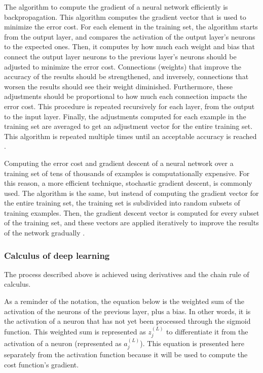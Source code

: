 ﻿\documentclass[12pt,a4paper,notitlepage]{article}
\begin{document}
The algorithm to compute the gradient of a neural network  efficiently is backpropagation. This algorithm computes the gradient vector that is used to minimize the error cost. For each element in the training set, the algorithm starts from the output layer, and compares the activation of the output layer's neurons to the expected ones. Then, it computes by how much each weight and bias that connect the output layer neurons to the previous layer's neurons should be adjusted to minimize the error cost.  Connections (weights) that improve the accuracy of the results should be strengthened, and inversely, connections that worsen the results should see their weight diminished. Furthermore, these adjustments should be proportional to how much each connection impacts the error cost. This procedure is repeated recursively for each layer, from the output to the input layer. Finally, the adjustments computed for each example in the training set are averaged to get an adjustment vector for the entire training set. This algorithm is repeated multiple times until an acceptable accuracy is reached \cite{sanderson_gradient_2017}.

Computing the error cost and gradient descent of a neural network over a training set of tens of thousands of examples is computationally expensive. For this reason, a more efficient technique, stochastic gradient descent, is commonly used. The algorithm is the same, but instead of computing the gradient vector for the entire training set, the training set is subdivided into  random subsets of training examples. Then, the gradient descent vector is computed for every subset of the training set, and these vectors are applied iteratively to improve the results of the network gradually \cite{sanderson_gradient_2017}.

\subsubsection{Calculus of deep learning}
The process described above is achieved using derivatives and the chain rule of calculus.

As a reminder of the notation, the equation below is the weighted sum of the activation of the neurons of the previous layer, plus a bias. In other words, it is the activation of a neuron that has not yet been processed through the sigmoid function. This weighted sum is represented as \(z_j^{(L)}\) to differentiate it from the activation of a neuron (represented as \(a_j^{(L)}\)). This equation is presented here separately from the activation function because it will be used to compute the 
cost function's gradient.
\end{document}

